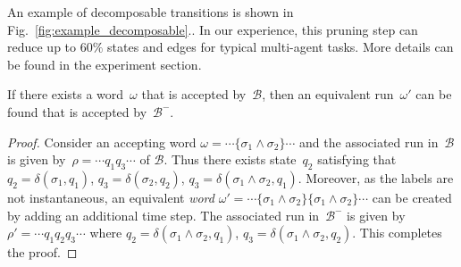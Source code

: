An example of decomposable transitions is shown in Fig.~\ref{fig:example_decomposable}..
In our experience, this pruning step can reduce up to $60\%$ states and edges for typical multi-agent tasks.
More details can be found in the experiment section. 
\begin{lemma}
  If there exists a word~$\omega$ that is accepted by~$\mathcal{B}$,
  then an equivalent run~$\omega'$ can be found that is accepted by~$\mathcal{B}^-$.
\end{lemma}
\begin{proof}
  Consider an accepting word $\omega=\cdots\{\sigma_1\land\sigma_2\}\cdots$
  and the associated run in~$\mathcal{B}$ is given by~$\rho=\cdots q_1 q_3\cdots$ of $\mathcal{B}$.
  Thus there exists state~$q_2$ satisfying that 
  $q_2=\delta(\sigma_1,q_1)$, $q_3=\delta(\sigma_2,q_2)$, $q_3=\delta(\sigma_1\land\sigma_2,q_1)$.
  Moreover, as the labels are not instantaneous, 
  an equivalent \emph{word} $\omega'=\cdots\{\sigma_1\land\sigma_2\}\{\sigma_1\land\sigma_2\}\cdots$
  can be created by adding an additional time step.
  The associated run in~$\mathcal{B}^-$ is given by~$\rho'=\cdots q_1 q_2 q_3\cdots$ where
  $q_2=\delta(\sigma_1\land\sigma_2,q_1)$, $q_3=\delta(\sigma_1\land\sigma_2,q_2)$.
  This completes the proof.
\end{proof}






